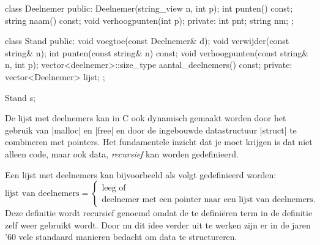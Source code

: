 \begin{cpplstShortInline}
\begin{cpplstfragment}
class Deelnemer {
public:
	Deelnemer(string_view n, int p);
	int punten() const;
	string naam() const;
	void verhoogpunten(int p);
private:
	int pnt;
	string nm;
};

class Stand {
public:
	void voegtoe(const Deelnemer& d);
	void verwijder(const string& n);
	int punten(const string& n) const;
	void verhoogpunten(const string& n, int p);
	vector<deelnemer>::size_type aantal_deelnemers() const;
private:
	vector<Deelnemer> lijst;
};

Stand s;
\end{cpplstfragment}

De lijst met deelnemers kan in C ook dynamisch gemaakt worden door het gebruik van |malloc| en |free| en door de ingebouwde datastructuur |struct| te combineren met pointers.
Het fundamentele inzicht dat je moet krijgen is dat niet alleen code, maar ook data, \emph{recursief} kan worden gedefinieerd.

Een lijst met deelnemers kan bijvoorbeeld als volgt gedefinieerd worden:
\[
\text{lijst van deelnemers} = \left\{
\begin{array}{ll}
\text{leeg of} \\
\text{deelnemer met een pointer naar een lijst van deelnemers.}
\end{array}
\right.
\]
Deze definitie wordt recursief genoemd omdat de te definiëren term in de definitie zelf weer gebruikt wordt.
Door nu dit idee verder uit te werken zijn er in de jaren '60 vele standaard manieren bedacht om data te structureren.


\end{cpplstShortInline}
